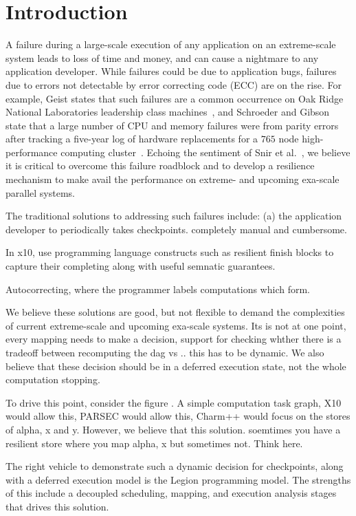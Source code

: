\section{Introduction}

A failure during a large-scale execution of any application on an extreme-scale
system leads to loss of time and money, and can cause a nightmare to any
application developer. While failures could be due to application bugs,
failures due to errors not detectable by error correcting code (ECC) are on the
rise.  For example, Geist states that such failures are a common occurrence on
Oak Ridge National Laboratories leadership class machines~\cite{errors_ecc},
and Schroeder and Gibson state that a large number of CPU and memory failures
were from parity errors after tracking a five-year log of hardware replacements
for a $765$ node high-performance computing cluster~\cite{schroeder_gibson}.
Echoing the sentiment of Snir et al.~\cite{snir}, we believe it is critical to
overcome this failure roadblock and to develop a resilience mechanism to make 
avail the performance on extreme- and upcoming exa-scale parallel systems.

The traditional solutions to addressing such failures include: (a) the
application developer to periodically takes checkpoints. completely manual and
cumbersome.

In x10, use programming language constructs such as resilient finish blocks to
capture their completing along with useful semnatic guarantees. 

Autocorrecting, where the programmer labels computations which form. 

We believe these solutions are good, but not flexible to demand the
complexities of current extreme-scale and upcoming exa-scale systems. Its is
not at one point, every mapping needs to make a decision, support for checking
whther there is a tradeoff between recomputing the dag vs .. this has to be
dynamic. We also believe that these decision should be in a deferred execution
state, not the whole computation stopping.


To drive this point, consider the figure . A simple computation task graph, X10
would allow this, PARSEC would allow this, Charm++ would focus on the stores of
alpha, x and y. However, we believe that this solution.  soemtimes you have a
resilient store where you map alpha, x but sometimes not. Think here.

The right vehicle to demonstrate such a dynamic decision for checkpoints, along
with a deferred execution model is the Legion programming model. The strengths
of this include a decoupled scheduling, mapping, and execution analysis stages
that drives this solution.

